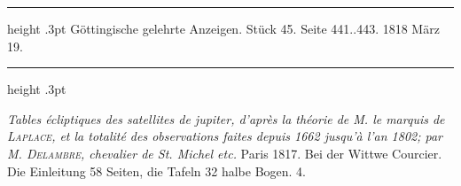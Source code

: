 \par\bigskip
\hypertarget{native-608-lower}{}
\begin{center}
\parbox{.83\linewidth}{%
\centering\small
\hrule height .3pt\relax\vspace{2.5pt}
Göttingische gelehrte Anzeigen. Stück 45. Seite 441..443. 1818 März 19.\par
\vspace{2.5pt}\hrule height .3pt\relax
}
\end{center}

\emph{Tables écliptiques des satellites de jupiter, d'après la théorie de M. le marquis de \textup{\textsc{Laplace}}, et la totalité des observations faites depuis \textup{1662} jusqu'à l'an \textup{1802}; par M. \textup{\textsc{Delambre}}, chevalier de St. Michel etc.} Paris 1817. Bei der Wittwe Courcier. Die Einleitung 58 Seiten, die Tafeln 32 halbe Bogen. 4.

